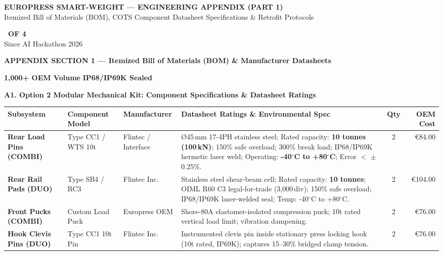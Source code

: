 \documentclass[10pt,a4paper]{article}
\newcommand{\headerbar}[3]{%
  \begin{tcolorbox}[colback=europressdark, colframe=europressdark, arc=3pt, leftrule=5pt, colbacktitle=europressdark, coltitle=white, boxsep=1pt, left=6pt, right=6pt, top=4pt, bottom=4pt, borderline west={4pt}{0pt}{#2}]
    \begin{minipage}[c]{0.74\textwidth}
      {\fontsize{10.5pt}{12pt}\selectfont \textbf{\color{white}EUROPRESS SMART-WEIGHT --- #1}}\\[1pt]
      {\fontsize{7pt}{8.5pt}\selectfont \color{gray!40}#3}
    \end{minipage}%
    \hfill
    \begin{minipage}[c]{0.24\textwidth}
      \raggedleft
      \colorbox{#2}{\fontsize{6.5pt}{7.5pt}\selectfont\color{white}\textbf{\MakeUppercase{\thepage\ OF 4}}}%
      \\[1.5pt]
      {\fontsize{6pt}{7pt}\selectfont \color{gray!30}Since AI Hackathon 2026}
    \end{minipage}
  \end{tcolorbox}
  \vspace{-4pt}
}
\newcommand{\conceptbanner}[5]{%
  \begin{tcolorbox}[colback=bannergray, colframe=bordergray, arc=3pt, leftrule=4pt, boxsep=1pt, left=6pt, right=6pt, top=3pt, bottom=3pt, borderline west={3.5pt}{0pt}{#1}]
    \begin{minipage}[c]{0.56\textwidth}
      {\fontsize{8pt}{9.5pt}\selectfont \textbf{\color{europressdark}#2}}
    \end{minipage}%
    \hfill
    \begin{minipage}[c]{0.42\textwidth}
      \raggedleft
      \colorbox{#3}{\fontsize{6pt}{7pt}\selectfont\color{white}\textbf{#4}} \hspace{1pt}
      \colorbox{europressdark}{\fontsize{6pt}{7pt}\selectfont\color{white}\textbf{#5}}
    \end{minipage}
  \end{tcolorbox}
  \vspace{-3pt}
}
\begin{document}

\headerbar{ENGINEERING APPENDIX (PART 1)}{techgreen}{Itemized Bill of Materials (BOM), COTS Component Datasheet Specifications \& Retrofit Protocols}

\conceptbanner{techgreen}{APPENDIX SECTION 1 --- Itemized Bill of Materials (BOM) \& Manufacturer Datasheets}{techgreen}{1,000+ OEM Volume}{IP68/IP69K Sealed}

\begin{tcolorbox}[colback=white, colframe=bordergray, arc=3pt, boxsep=2pt, left=5pt, right=5pt, top=3pt, bottom=3pt]
{\fontsize{7.5pt}{8.5pt}\selectfont \textbf{\color{europressred}A1. Option 2 Modular Mechanical Kit: Component Specifications \& Datasheet Ratings}}\\[2pt]
{\fontsize{6.5pt}{7.8pt}\selectfont
\begin{tabularx}{\textwidth}{l p{2.2cm} p{1.8cm} X c r}
\toprule
\textbf{Subsystem} & \textbf{Component Model} & \textbf{Manufacturer} & \textbf{Datasheet Ratings \& Environmental Spec} & \textbf{Qty} & \textbf{OEM Cost} \\
\midrule
\textbf{Rear Load Pins (COMBI)} & Type CC1 / WTS 10t & Flintec / Interface & Ø45\,mm 17-4PH stainless steel; Rated capacity: \textbf{10 tonnes (100\,kN)}; 150\% safe overload; 300\% break load; IP68/IP69K hermetic laser weld; Operating: \textbf{-40$^\circ$C to +80$^\circ$C}; Error $<$ $\pm$0.25\%. & 2 & \euro{}84.00 \\
\textbf{Rear Rail Pads (DUO)} & Type SB4 / RC3 & Flintec Inc. & Stainless steel shear-beam cell; Rated capacity: \textbf{10 tonnes}; OIML R60 C3 legal-for-trade (3,000\,div); 150\% safe overload; IP68/IP69K laser-welded seal; Temp: -40$^\circ$C to +80$^\circ$C. & 2 & \euro{}104.00 \\
\textbf{Front Pucks (COMBI)} & Custom Load Puck & Europress OEM & Shore-80A elastomer-isolated compression puck; 10t rated vertical load limit; vibration dampening. & 2 & \euro{}76.00 \\
\textbf{Hook Clevis Pins (DUO)} & Type CC1 10t Pin & Flintec Inc. & Instrumented clevis pin inside stationary press locking hook (10t rated, IP69K); captures 15--30\% bridged clamp tension. & 2 & \euro{}76.00 \\

\end{tabularx}}
\end{tcolorbox}
\end{document}
